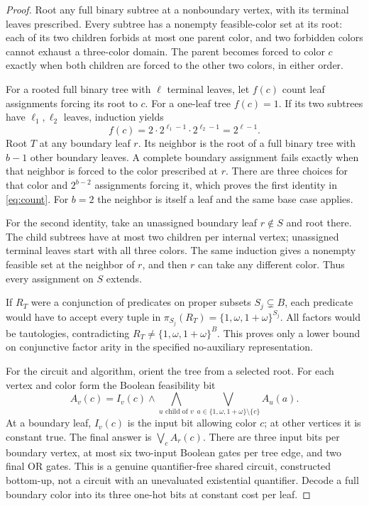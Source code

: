 \documentclass[11pt]{article}
\newcommand{\C}{\{1,\omega,1+\omega\}}
\begin{document}
\begin{proof}
Root any full binary subtree at a nonboundary vertex, with its terminal
leaves prescribed. Every subtree has a nonempty feasible-color set at its
root: each of its two children forbids at most one parent color, and two
forbidden colors cannot exhaust a three-color domain. The parent becomes
forced to color $c$ exactly when both children are forced to the other two
colors, in either order.

For a rooted full binary tree with $\ell$ terminal leaves, let $f(c)$ count
leaf assignments forcing its root to $c$. For a one-leaf tree $f(c)=1$.
If its two subtrees have $\ell_1,\ell_2$ leaves, induction yields
\[
 f(c)=2\cdot2^{\ell_1-1}\cdot2^{\ell_2-1}=2^{\ell-1}.
\]
Root $T$ at any boundary leaf $r$. Its neighbor is the root of a full binary
tree with $b-1$ other boundary leaves. A complete boundary assignment fails
exactly when that neighbor is forced to the color prescribed at $r$.
There are three choices for that color and $2^{b-2}$ assignments forcing it,
which proves the first identity in \eqref{eq:count}. For $b=2$ the neighbor
is itself a leaf and the same base case applies.

For the second identity, take an unassigned boundary leaf $r\notin S$ and
root there. The child subtrees have at most two children per internal vertex;
unassigned terminal leaves start with all three colors. The same induction
gives a nonempty feasible set at the neighbor of $r$, and then $r$ can take
any different color. Thus every assignment on $S$ extends.

If $R_T$ were a conjunction of predicates on proper subsets $S_j\subsetneq B$,
each predicate would have to accept every tuple in $\pi_{S_j}(R_T)=\C^{S_j}$.
All factors would be tautologies, contradicting $R_T\ne\C^B$. This proves
only a lower bound on conjunctive factor arity in the specified no-auxiliary
representation.

For the circuit and algorithm, orient the tree from a selected root. For each
vertex and color form the Boolean feasibility bit
\[
 A_v(c)=I_v(c)\land\bigwedge_{u\text{ child of }v}
                 \bigvee_{a\in\C\setminus\{c\}}A_u(a).
\]
At a boundary leaf, $I_v(c)$ is the input bit allowing color $c$; at other
vertices it is constant true. The final answer is $\bigvee_c A_r(c)$.
There are three input bits per boundary vertex, at most six two-input
Boolean gates per tree edge, and two final OR gates. This is a genuine
quantifier-free shared circuit, constructed bottom-up, not a circuit with
an unevaluated existential quantifier. Decode a full boundary color into its
three one-hot bits at constant cost per leaf.


\end{proof}
\end{document}
